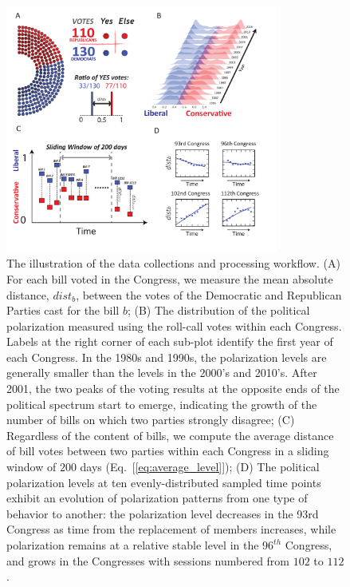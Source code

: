 \begin{figure}
    \centering
    \includegraphics[width=0.8\textwidth]{img/chap4/Fig1.pdf}
    \caption{The illustration of the data collections and processing workflow. (A) For each bill voted in the Congress, we measure the mean absolute distance, 
$\textit{dist}_b$, between the votes of the Democratic and Republican Parties cast for the bill $b$; (B) The distribution of the political polarization measured using the roll-call votes within each Congress. Labels at the right corner of each sub-plot identify the first year of each Congress. In the 1980s and 1990s, the polarization levels are generally smaller than the levels in the 2000's and 2010's. After 2001, the two peaks of the voting results at the opposite ends of the political spectrum start to emerge, indicating the growth of the number of bills on which two parties strongly disagree; (C) Regardless of the content of bills, we compute the average distance of bill votes between two parties within each Congress in a sliding window of $200$ days (Eq.~[\ref{eq:average_level}]); (D) The political polarization levels at ten evenly-distributed sampled time points exhibit an evolution of polarization patterns from one type of behavior to another: the polarization level decreases in the 93rd Congress as time from the replacement of members increases, while polarization remains at a relative stable level in the 
$96^{th}$ Congress, and grows in the Congresses with sessions numbered from $102$ to $112$.}
    \label{fig:fig1}
\end{figure}

